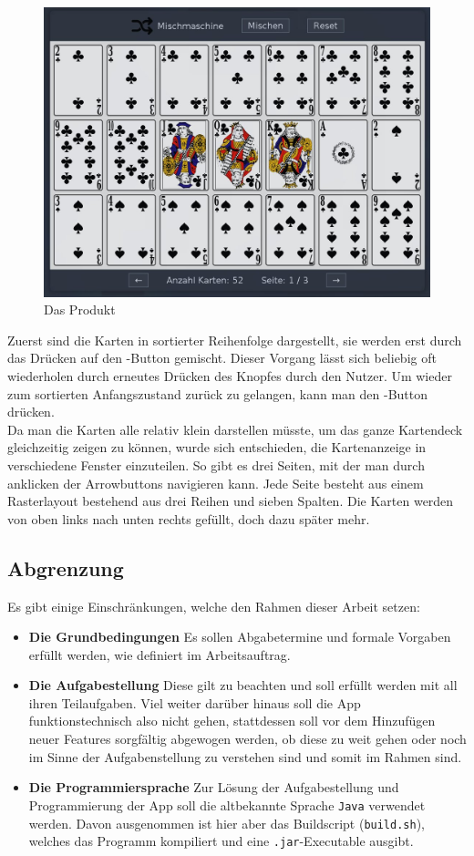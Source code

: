 \documentclass[a4paper,11pt]{article}
\begin{document}
\begin{figure}[H]
    \centering
    \includegraphics[width=.7\textwidth]{media/early-screenshot.jpg}
    \caption{Das Produkt}
\end{figure}

Zuerst sind die Karten in sortierter Reihenfolge dargestellt, sie werden erst durch das Drücken auf den -Button gemischt. Dieser Vorgang lässt sich beliebig oft wiederholen durch erneutes Drücken des Knopfes durch den Nutzer. Um wieder zum sortierten Anfangszustand zurück zu gelangen, kann man den -Button drücken.\\

Da man die Karten alle relativ klein darstellen müsste, um das ganze Kartendeck gleichzeitig zeigen zu können, wurde sich entschieden, die Kartenanzeige in verschiedene Fenster einzuteilen. So gibt es drei Seiten, mit der man durch anklicken der Arrowbuttons navigieren kann. Jede Seite besteht aus einem Rasterlayout bestehend aus drei Reihen und sieben Spalten. Die Karten werden von oben links nach unten rechts gefüllt, doch dazu später mehr.\\


\subsection{Abgrenzung}
Es gibt einige Einschränkungen, welche den Rahmen dieser Arbeit setzen:

\begin{itemize}
    \item \textbf{Die Grundbedingungen} Es sollen Abgabetermine und formale Vorgaben erfüllt werden, wie definiert im Arbeitsauftrag.
    \item \textbf{Die Aufgabestellung} Diese gilt zu beachten und soll erfüllt werden mit all ihren Teilaufgaben. Viel weiter darüber hinaus soll die App funktionstechnisch also nicht gehen, stattdessen soll vor dem Hinzufügen neuer Features sorgfältig abgewogen werden, ob diese zu weit gehen oder noch im Sinne der Aufgabenstellung zu verstehen sind und somit im Rahmen sind.
    \item \textbf{Die Programmiersprache} Zur Lösung der Aufgabestellung und Programmierung der App soll die altbekannte Sprache \texttt{Java} verwendet werden. Davon ausgenommen ist hier aber das Buildscript (\texttt{build.sh}), welches das Programm kompiliert und eine \texttt{.jar}-Executable ausgibt.
\end{itemize}
\end{document}
